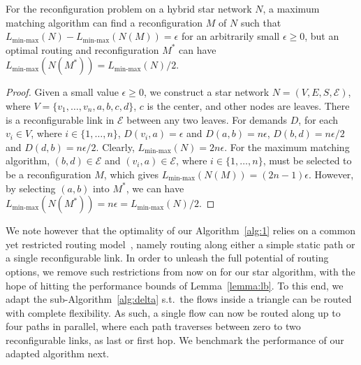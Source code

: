 \documentclass[sigconf]{acmart}
\newcommand{\E}{\mathcal{E}}  %
\begin{document}
\begin{lemma}
For the reconfiguration problem on a hybrid star network $N$, a maximum matching algorithm can find a reconfiguration $M$ of  $N$ such that $L_{\text{min-max}}\left(N \right)-L_{\text{min-max}}\left(N(M) \right)= \epsilon$ for an arbitrarily small $\epsilon\ge 0$, but an optimal routing and reconfiguration $M^*$ can have $L_{\text{min-max}}\left(N(M^*) \right)=L_{\text{min-max}}\left( N\right)/2$.
\end{lemma}
\begin{proof}
Given a small value $\epsilon\ge 0$, we construct a star network $N=(V,E,S,\E)$, where $V=\{v_1,\ldots,v_n, a, b,c,d\}$, $c$ is the center, and other nodes are leaves. There is a reconfigurable link in $\E$ between any two leaves. For demands $D$, for each $v_i\in V$, where $i\in \{1,\ldots,n\}$, $D(v_i,a)=\epsilon$ and $D(a,b)=n\epsilon$, $D(b,d)=n\epsilon/2$ and $D(d,b)=n\epsilon/2$. Clearly, $L_{\text{min-max}}\left(N \right)=2n\epsilon$. For the maximum matching algorithm, $(b,d)\in \E$ and $(v_i,a)\in \E$, where $i\in \{1,\ldots,n\}$, must be selected to be a reconfiguration $M$, which gives $L_{\text{min-max}}\left(N(M) \right)=(2n-1)\epsilon$. However, by selecting $(a,b)$ into $M^*$, we can have   $L_{\text{min-max}}\left(N(M^*) \right)=n\epsilon=L_{\text{min-max}}\left(N \right)/2$.
\end{proof}

We note however that the optimality of our Algorithm~\ref{alg:1} relies on a common yet restricted routing model~\cite{helios,cthrough}, namely routing along either a simple static path or a single reconfigurable link.
In order to unleash the full potential of routing options, we remove such restrictions from now on for our star algorithm, with the hope of hitting the performance bounds of Lemma~\ref{lemma:lb}.
%
To this end, we adapt the sub-Algorithm~\ref{alg:delta} s.t.\ the flows inside a triangle can be routed with complete flexibility. As such, a single flow can now be routed along up to four paths in parallel, where each path traverses between zero to two reconfigurable links, as last or first hop.
We benchmark the performance of our adapted algorithm next.
\end{document}
